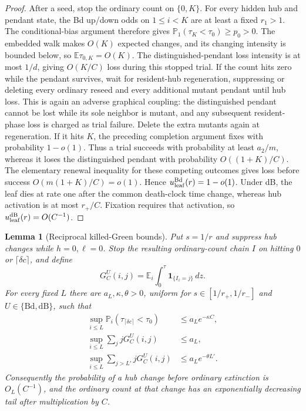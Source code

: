 \documentclass[11pt]{article}
\newtheorem{lemma}[theorem]{Lemma}
\theoremstyle{definition}
\theoremstyle{remark}
\newcommand{\Bd}{\mathrm{Bd}}
\newcommand{\dB}{\mathrm{dB}}
\newcommand{\Prob}{\mathbb P}
\begin{document}
\begin{proof}
After a seed, stop the ordinary count on $\{0,K\}$.  For every hidden hub
and pendant state, the Bd up/down odds on $1\leq i<K$ are at least a fixed
$r_1>1$.  The conditional-bias argument therefore gives
$\Prob_1(\tau_K<\tau_0)\geq p_0>0$.  The embedded walk makes $O(K)$ expected
changes, and its changing intensity is bounded below, so
$\mathbb E\tau_{0,K}=O(K)$.  The distinguished-pendant loss intensity is at
most $1/d$, giving $O(K/C)$ loss during this stopped trial.  If the count
hits zero while the pendant survives, wait for resident-hub regeneration,
suppressing or deleting every ordinary reseed and every additional mutant
pendant until hub loss.  This is again an adverse graphical coupling: the
distinguished pendant cannot be lost while its sole neighbor is mutant, and
any subsequent resident-phase loss is charged as trial failure.  Delete the
extra mutants again at regeneration.  If it hits $K$, the preceding completion
argument fixes with probability $1-o(1)$.  Thus a trial succeeds with
probability at least $a_2/m$, whereas it loses the distinguished pendant
with probability $O((1+K)/C)$.  The elementary renewal inequality for these
competing outcomes gives loss before success
$O(m(1+K)/C)=o(1)$.  Hence $u_{\rm leaf}^{\Bd}(r)=1-o(1)$.
Under dB, the leaf dies at rate one after the common death-clock time change,
whereas hub activation is at most $r_+/C$.  Fixation requires that activation,
so $u_{\rm leaf}^{\dB}(r)=O(C^{-1})$.
\end{proof}

\begin{lemma}[Reciprocal killed-Green bounds]
\label{lem:killed-green}
Put $s=1/r$ and suppress hub changes while $h=0,\ell=0$.  Stop the resulting
ordinary-count chain $I$ on hitting $0$ or $\lceil\delta c\rceil$, and define
\[
 G_C^U(i,j)=\mathbb E_i\int_0^\tau
             \mathbf1_{\{I_z=j\}}\,dz.
\]
For every fixed $L$ there are $a_L,\kappa,\theta>0$, uniform for
$s\in[1/r_+,1/r_-]$ and $U\in\{\Bd,\dB\}$, such that
\begin{align}
 \sup_{i\leq L}\Prob_i(\tau_{\lceil\delta c\rceil}<\tau_0)
 &\leq a_Le^{-\kappa C},\label{eq:green-macro}\\
 \sup_{i\leq L}\sum_jjG_C^U(i,j)&\leq a_L,
 \label{eq:green-mass}\\
 \sup_{i\leq L}\sum_{j>L'}jG_C^U(i,j)
 &\leq a_Le^{-\theta L'}.
 \label{eq:green-tail}
\end{align}
Consequently the probability of a hub change before ordinary extinction is
$O_L(C^{-1})$, and the ordinary count at that change has an exponentially
decreasing tail after multiplication by $C$.
\end{lemma}
\end{document}
